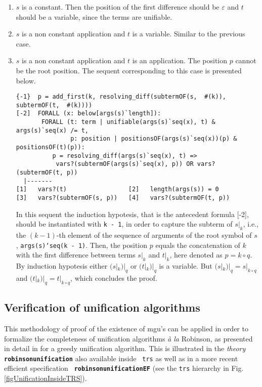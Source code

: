 \documentclass[submission,copyright,creativecommons]{eptcs}
\begin{document}
\begin{enumerate}

\item $s$ is a constant. Then the position of the first difference
  should be $\varepsilon$ and $t$ should be a variable, since the
  terms are unifiable.

\item $s$ is a non constant application and $t$ is a variable. Similar
  to the previous case.

\item $s$ is a non constant application and $t$ is an application.
  The position $p$ cannot be the root position. The sequent
  corresponding to this case is presented below.

  {\small
\begin{verbatim}
{-1}  p = add_first(k, resolving_diff(subtermOF(s,  #(k)), subtermOF(t,  #(k))))
[-2]  FORALL (x: below[args(s)`length]):
       FORALL (t: term | unifiable(args(s)`seq(x), t) & args(s)`seq(x) /= t,
               p: position | positionsOF(args(s)`seq(x))(p) & positionsOF(t)(p)):
          p = resolving_diff(args(s)`seq(x), t) =>
           vars?(subtermOF(args(s)`seq(x), p)) OR vars?(subtermOF(t, p))
  |-------
[1]   vars?(t)                 [2]   length(args(s)) = 0
[3]   vars?(subtermOF(s, p))   [4]   vars?(subtermOF(t, p))
\end{verbatim}
  }

  In this sequent the induction hypotesis, that is the antecedent
  formula [-2], should be instantiated with {\tt k - 1}, in order to
  capture the subterm of $s|_k$, i.e., the $(k - 1)$-th element of the
  sequence of arguments of the root symbol of $s$, {\tt args(s)`seq(k
    - 1)}. Then, the position $p$ equals the concatenation of $k$ with
  the first difference between terms $s|_k$ and $t|_k$, here denoted
  as $p = k \circ q$. By induction hypotesis either $(s|_k)|_q$ or
  $(t|_k)|_q$ is a variable. But $(s|_k)|_q = s|_{k \circ q}$ and
  $(t|_k)|_q = t|_{k \circ q}$, which concludes the proof.

\end{enumerate}

\subsection{Verification of unification algorithms}

This methodology of proof of the existence of mgu's can be applied in
order to formalize the completeness of unification algorithms {\em \`a
  la} Robinson, as presented in detail in \cite{AMARG2010} for a
greedy unification algorithm.  This is illustrated in the
\emph{theory} {\tt \bf robinsonunification} also available inside {\tt
  trs} as well as in a more recent efficient specification {\tt\bf
  robinsonunificationEF} (see the {\tt trs} hierarchy in
Fig. \ref{figUnificationInsideTRS}).
\end{document}
